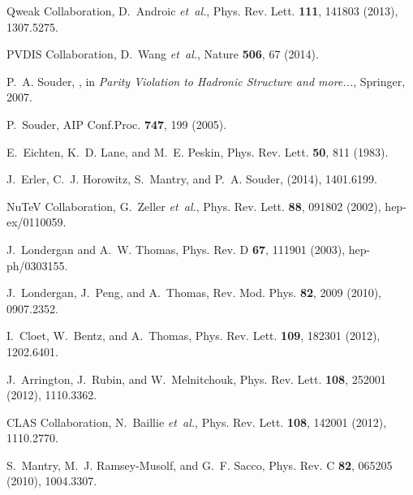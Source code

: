 \documentclass[12pt]{article}
\begin{document}
\begin{thebibliography}{99}
Qweak Collaboration, D.~Androic {\em et~al.},
\newblock Phys. Rev. Lett. {\bf 111}, 141803 (2013), 1307.5275.

PVDIS Collaboration, D.~Wang {\em et~al.},
\newblock Nature {\bf 506}, 67 (2014).

P.~A. Souder,
,
\newblock in {\em {Parity Violation to Hadronic Structure and more...}},
  Springer, 2007.

P.~Souder,
\newblock AIP Conf.Proc. {\bf 747}, 199 (2005).

E.~Eichten, K.~D. Lane, and M.~E. Peskin,
\newblock Phys. Rev. Lett. {\bf 50}, 811 (1983).

J.~Erler, C.~J. Horowitz, S.~Mantry, and P.~A. Souder,
\newblock (2014), 1401.6199.

NuTeV Collaboration, G.~Zeller {\em et~al.},
\newblock Phys. Rev. Lett. {\bf 88}, 091802 (2002), hep-ex/0110059.

J.~Londergan and A.~W. Thomas,
\newblock Phys. Rev. D {\bf 67}, 111901 (2003), hep-ph/0303155.

J.~Londergan, J.~Peng, and A.~Thomas,
\newblock Rev. Mod. Phys. {\bf 82}, 2009 (2010), 0907.2352.

I.~Cloet, W.~Bentz, and A.~Thomas,
\newblock Phys. Rev. Lett. {\bf 109}, 182301 (2012), 1202.6401.

J.~Arrington, J.~Rubin, and W.~Melnitchouk,
\newblock Phys. Rev. Lett. {\bf 108}, 252001 (2012), 1110.3362.

CLAS Collaboration, N.~Baillie {\em et~al.},
\newblock Phys. Rev. Lett. {\bf 108}, 142001 (2012), 1110.2770.

S.~Mantry, M.~J. Ramsey-Musolf, and G.~F. Sacco,
\newblock Phys. Rev. C {\bf 82}, 065205 (2010), 1004.3307.



\end{thebibliography}
\end{document}

